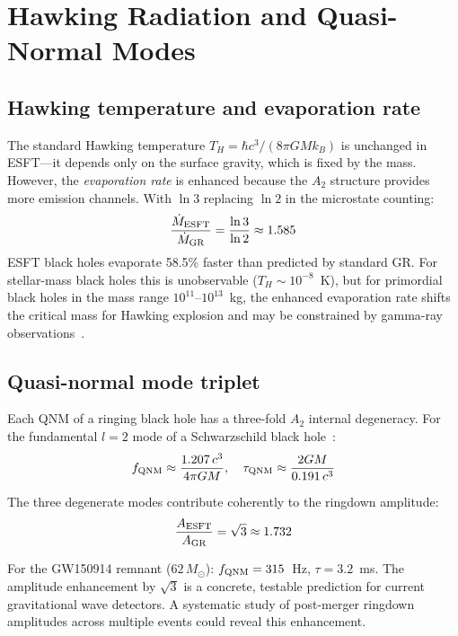 ﻿\documentclass[twocolumn,preprintnumbers,amsmath,amssymb,prd]{revtex4-2}
\begin{document}
\section{Hawking Radiation and Quasi-Normal Modes}
\label{sec:hawking_qnm}

\subsection{Hawking temperature and evaporation rate}

The standard Hawking temperature $T_H = \hbar c^3/(8\pi G M k_B)$ is unchanged in ESFT---it depends only on the surface gravity, which is fixed by the mass. However, the \emph{evaporation rate} is enhanced because the $A_2$ structure provides more emission channels. With $\ln 3$ replacing $\ln 2$ in the microstate counting:
\begin{equation}
\frac{\dot{M}_{\rm ESFT}}{\dot{M}_{\rm GR}} = \frac{\ln 3}{\ln 2} \approx 1.585
\end{equation}
ESFT black holes evaporate 58.5\% faster than predicted by standard GR. For stellar-mass black holes this is unobservable ($T_H \sim 10^{-8}$~K), but for primordial black holes in the mass range $10^{11}$--$10^{13}$~kg, the enhanced evaporation rate shifts the critical mass for Hawking explosion and may be constrained by gamma-ray observations~\cite{PDG2024}.

\subsection{Quasi-normal mode triplet}

Each QNM of a ringing black hole has a three-fold $A_2$ internal degeneracy. For the fundamental $l=2$ mode of a Schwarzschild black hole~\cite{Leaver1985}:
\begin{equation}
f_{\rm QNM} \approx \frac{1.207\,c^3}{4\pi G M}, \quad \tau_{\rm QNM} \approx \frac{2GM}{0.191\,c^3}
\end{equation}

The three degenerate modes contribute coherently to the ringdown amplitude:
\begin{equation}
\frac{A_{\rm ESFT}}{A_{\rm GR}} = \sqrt{3} \approx 1.732
\label{eq:qnm_enhancement}
\end{equation}

For the GW150914 remnant ($62\,M_\odot$): $f_{\rm QNM} = 315$~Hz, $\tau = 3.2$~ms. The amplitude enhancement by $\sqrt{3}$ is a concrete, testable prediction for current gravitational wave detectors. A systematic study of post-merger ringdown amplitudes across multiple events could reveal this enhancement.
\end{document}
